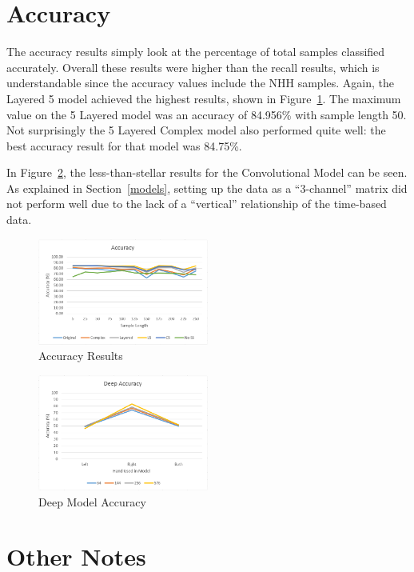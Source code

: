 \documentclass[]{report}
\begin{document}
\section{Accuracy}

The accuracy results simply look at the percentage of total samples classified accurately. Overall these results were higher than the recall results, which is understandable since the accuracy values include the NHH samples. Again, the Layered 5 model achieved the highest results, shown in Figure~\ref{accuracy}. The maximum value on the 5 Layered model was an accuracy of 84.956\% with sample length 50. Not surprisingly the 5 Layered Complex model also performed quite well: the best accuracy result for that model was 84.75\%.

In Figure~\ref{acuracy-deep}, the less-than-stellar results for the Convolutional Model can be seen. As explained in Section~\ref{models}, setting up the data as a ``3-channel'' matrix did not perform well due to the lack of a ``vertical'' relationship of the time-based data.
\begin{figure}
	\centering
	\includegraphics[width=0.5\textwidth]{../images/accuracy2}
	\caption{Accuracy Results}
	\label{accuracy}
\end{figure}
\begin{figure}
	\centering
	\includegraphics[width=0.5\textwidth]{../images/deepresults}
	\caption{Deep Model Accuracy}
	\label{acuracy-deep}
\end{figure}

\section{Other Notes}
\end{document}
